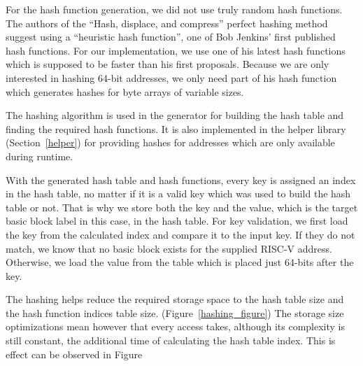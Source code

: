 \documentclass[course=eragp]{aspdoc}
\begin{document}
\begin{enumerate}
          For the hash function generation, we did not use truly random hash functions. The authors of the ``Hash,
          displace, and compress'' perfect hashing method suggest using a ``heuristic hash
          function''\cite{CHD}, one of Bob Jenkins' first published hash functions.\cite{jenkins_hash_1} For
          our implementation, we use one of his latest hash functions which is supposed to be faster than his
          first proposals.\cite{jenkins_hash_2} Because we are only interested in hashing 64-bit addresses, we
          only need part of his hash function which generates hashes for byte arrays of variable sizes.

          \par

          The hashing algorithm is used in the generator for building the hash table and finding the required
          hash functions. It is also implemented in the helper library (Section~\ref{helper}) for providing hashes for addresses
          which are only available during runtime.

          \par

          With the generated hash table and hash functions, every key is assigned an index in the hash table,
          no matter if it is a valid key which was used to build the hash table or not. That is why we store
          both the key and the value, which is the target basic block label in this case, in the hash table.
          For key validation, we first load the key from the calculated index and compare it to the input key.
          If they do not match, we know that no basic block exists for the supplied RISC-V address. Otherwise,
          we load the value from the table which is placed just 64-bits after the key.

          \par

          The hashing helps reduce the required storage space to the hash table size and the hash function
          indices table size. (Figure~\ref{hashing_figure}) The storage size optimizations mean however that
          every access takes, although its complexity is still constant, the additional time of calculating
          the hash table index. This is effect can be observed in Figure
\end{enumerate}
\end{document}

